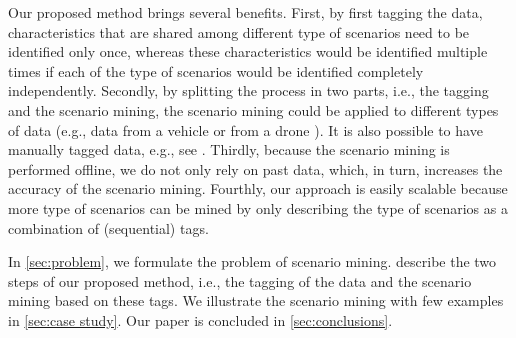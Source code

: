 Our proposed method brings several benefits. 
First, by first tagging the data, characteristics that are shared among different type of scenarios need to be identified only once, whereas these characteristics would be identified multiple times if each of the type of scenarios would be identified completely independently.
Secondly, by splitting the process in two parts, i.e., the tagging and the scenario mining, the scenario mining could be applied to different types of data (e.g., data from a vehicle \autocite{paardekooper2019dataset6000km} or from a drone \autocite{krajewski2018highD}). It is also possible to have manually tagged data, e.g., see \autocite{fontana2018action}. Thirdly, because the scenario mining is performed offline, we do not only rely on past data, which, in turn, increases the accuracy of the scenario mining. Fourthly, our approach is easily scalable because more type of scenarios can be mined by only describing the type of scenarios as a combination of (sequential) tags.

In \cref{sec:problem}, we formulate the problem of scenario mining.  describe the two steps of our proposed method, i.e., the tagging of the data and the scenario mining based on these tags. We illustrate the scenario mining with few examples in \cref{sec:case study}. Our paper is concluded in \cref{sec:conclusions}.

\cenda
